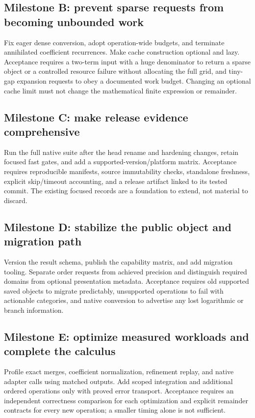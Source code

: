 \documentclass[11pt,a4paper]{article}
\begin{document}
\subsection{Milestone B: prevent sparse requests from becoming unbounded work}
Fix eager dense conversion, adopt operation-wide budgets, and terminate annihilated coefficient recurrences. Make cache construction optional and lazy. Acceptance requires a two-term input with a huge denominator to return a sparse object or a controlled resource failure without allocating the full grid, and tiny-gap expansion requests to obey a documented work budget. Changing an optional cache limit must not change the mathematical finite expression or remainder.

\subsection{Milestone C: make release evidence comprehensive}
Run the full native suite after the head rename and hardening changes, retain focused fast gates, and add a supported-version/platform matrix. Acceptance requires reproducible manifests, source immutability checks, standalone freshness, explicit skip/timeout accounting, and a release artifact linked to its tested commit. The existing focused records are a foundation to extend, not material to discard.

\subsection{Milestone D: stabilize the public object and migration path}
Version the result schema, publish the capability matrix, and add migration tooling. Separate order requests from achieved precision and distinguish required domains from optional presentation metadata. Acceptance requires old supported saved objects to migrate predictably, unsupported operations to fail with actionable categories, and native conversion to advertise any lost logarithmic or branch information.

\subsection{Milestone E: optimize measured workloads and complete the calculus}
Profile exact merges, coefficient normalization, refinement replay, and native adapter calls using matched outputs. Add scoped integration and additional ordered operations only with proved error transport. Acceptance requires an independent correctness comparison for each optimization and explicit remainder contracts for every new operation; a smaller timing alone is not sufficient.
\end{document}
